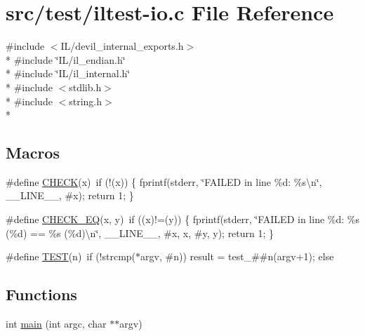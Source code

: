 \hypertarget{iltest-io_8c}{\section{src/test/iltest-\/io.c File Reference}
\label{iltest-io_8c}
}
{\ttfamily \#include $<$I\-L/devil\-\_\-internal\-\_\-exports.\-h$>$}\\*
{\ttfamily \#include \char`\"{}I\-L/il\-\_\-endian.\-h\char`\"{}}\\*
{\ttfamily \#include \char`\"{}I\-L/il\-\_\-internal.\-h\char`\"{}}\\*
{\ttfamily \#include $<$stdlib.\-h$>$}\\*
{\ttfamily \#include $<$string.\-h$>$}\\*
\subsection*{Macros}
\begin{DoxyCompactItemize}
\item 
\#define \hyperlink{iltest-io_8c_a763ffd798508592c5092ac77daa5a659}{C\-H\-E\-C\-K}(x)~if (!(x)) \{ fprintf(stderr, \char`\"{}F\-A\-I\-L\-E\-D in line \%d\-: \%s\textbackslash{}n\char`\"{}, \-\_\-\-\_\-\-L\-I\-N\-E\-\_\-\-\_\-, \#x); return 1; \}
\item 
\#define \hyperlink{iltest-io_8c_a6b889b604912562c774bb68b2960e8d3}{C\-H\-E\-C\-K\-\_\-\-E\-Q}(x, y)~if ((x)!=(y)) \{ fprintf(stderr, \char`\"{}F\-A\-I\-L\-E\-D in line \%d\-: \%s (\%d) == \%s (\%d)\textbackslash{}n\char`\"{}, \-\_\-\-\_\-\-L\-I\-N\-E\-\_\-\-\_\-, \#x, x, \#y, y); return 1; \}
\item 
\#define \hyperlink{iltest-io_8c_ac3d44964d4e029ca9274e12169c7fa61}{T\-E\-S\-T}(n)~if (!strcmp($\ast$argv, \#n)) result = test\-\_\-\#\#n(argv+1); else
\end{DoxyCompactItemize}
\subsection*{Functions}
\begin{DoxyCompactItemize}
\item 
int \hyperlink{iltest-io_8c_a3c04138a5bfe5d72780bb7e82a18e627}{main} (int argc, char $\ast$$\ast$argv)
\end{DoxyCompactItemize}


